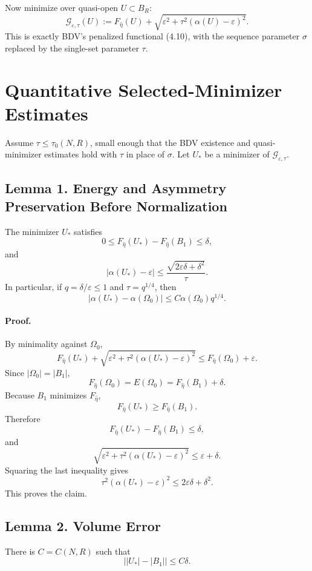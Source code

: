 \documentclass[11pt]{article}
\begin{document}
Now minimize over quasi-open \(U\subset B_R\):
\[
\mathcal G_{\varepsilon,\tau}(U)
:=
F_{\hat\eta}(U)
+
\sqrt{\varepsilon^2+\tau^2(\alpha(U)-\varepsilon)^2}.
\]
This is exactly BDV's penalized functional (4.10), with the sequence parameter
\(\sigma\) replaced by the single-set parameter \(\tau\).

\section{Quantitative Selected-Minimizer Estimates}

Assume \(\tau\le\tau_0(N,R)\), small enough that the BDV existence and
quasi-minimizer estimates hold with \(\tau\) in place of \(\sigma\). Let
\(U_*\) be a minimizer of \(\mathcal G_{\varepsilon,\tau}\).

\subsection*{Lemma 1. Energy and Asymmetry Preservation Before Normalization}

The minimizer \(U_*\) satisfies
\[
0\le
F_{\hat\eta}(U_*)-F_{\hat\eta}(B_1)
\le
\delta,
\]
and
\[
|\alpha(U_*)-\varepsilon|
\le
\frac{\sqrt{2\varepsilon\delta+\delta^2}}{\tau}.
\]
In particular, if \(q=\delta/\varepsilon\le1\) and \(\tau=q^{1/4}\), then
\[
|\alpha(U_*)-\alpha(\Omega_0)|
\le
C\alpha(\Omega_0)q^{1/4}.
\]

\paragraph{Proof.}
By minimality against \(\Omega_0\),
\[
F_{\hat\eta}(U_*)
+
\sqrt{\varepsilon^2+\tau^2(\alpha(U_*)-\varepsilon)^2}
\le
F_{\hat\eta}(\Omega_0)+\varepsilon.
\]
Since \(|\Omega_0|=|B_1|\),
\[
F_{\hat\eta}(\Omega_0)=E(\Omega_0)
=F_{\hat\eta}(B_1)+\delta.
\]
Because \(B_1\) minimizes \(F_{\hat\eta}\),
\[
F_{\hat\eta}(U_*)\ge F_{\hat\eta}(B_1).
\]
Therefore
\[
F_{\hat\eta}(U_*)-F_{\hat\eta}(B_1)\le\delta,
\]
and
\[
\sqrt{\varepsilon^2+\tau^2(\alpha(U_*)-\varepsilon)^2}
\le
\varepsilon+\delta.
\]
Squaring the last inequality gives
\[
\tau^2(\alpha(U_*)-\varepsilon)^2
\le
2\varepsilon\delta+\delta^2.
\]
This proves the claim.

\subsection*{Lemma 2. Volume Error}

There is \(C=C(N,R)\) such that
\[
\bigl||U_*|-|B_1|\bigr|
\le
C\delta.
\]
\end{document}
